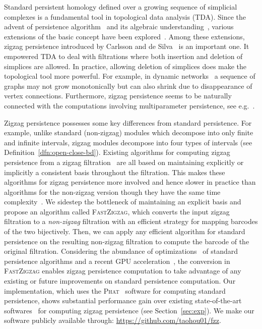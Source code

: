 \documentclass[letterpaper,11pt]{article}
\theoremstyle{mythmstyle}
\theoremstyle{mydefstyle}
\theoremstyle{plain}
\theoremstyle{definition}
\newcommand{\<}[1]{\langle #1\rangle}
\newcommand{\Phat}{\textsc{Phat}}
\begin{document}
Standard persistent homology defined over a growing sequence 
of simplicial complexes is
a fundamental tool in topological data analysis (TDA). Since the advent of
persistence algorithm~\cite{edelsbrunner2000topological} and its algebraic
understanding~\cite{zomorodian2005computing}, various extensions of the basic concept
have been explored~\cite{carlsson2010zigzag,carlsson2009zigzag-realvalue,cohen2009extending,de2011dualities}.
Among these extensions,
zigzag persistence introduced by Carlsson and de Silva~\cite{carlsson2010zigzag} is
an important one. It
empowered TDA to deal with 
filtrations where both insertion
and deletion of simplices are allowed. 
In practice, allowing deletion of simplices does make the topological tool more powerful.
For example, in dynamic networks~\cite{dey2021graph,holme2012temporal}
 a sequence of graphs may not grow monotonically but can also shrink due to
disappearance of vertex connections. Furthermore,
zigzag persistence seems to be naturally connected with the 
computations involving multiparameter
persistence, see e.g.~\cite{dey2021updating,dey2021computing}.

Zigzag persistence possesses some key differences
from standard persistence. For example,
unlike standard (non-zigzag) modules which decompose
into only finite and infinite intervals, zigzag modules
decompose into {four types} of intervals (see Definition~\ref{dfn:open-close-bd}).
Existing algorithms for computing zigzag persistence from a zigzag filtration~\cite{carlsson2009zigzag-realvalue,maria2014zigzag,maria2016computing,maria2019discrete}
are all based on maintaining explicitly or implicitly a consistent basis throughout the filtration.
This makes these algorithms
for zigzag persistence 
more involved and hence slower in practice
than algorithms for
the non-zigzag version though they have the same time complexity~\cite{milosavljevic2011zigzag}.
We sidestep the bottleneck of maintaining an explicit basis 
and propose an algorithm called \textsc{FastZigzag}, which converts
the input zigzag filtration
to a \emph{non-zigzag} filtration with an efficient strategy for mapping barcodes of the two bijectively. Then, we can apply any  efficient algorithm for standard persistence  on the
resulting non-zigzag filtration to compute the barcode of the original filtration.
Considering the abundance of optimizations~\cite{bauer2021ripser,bauer2014clear,bauer2017phat,BDM15,chen2011persistent,CK13} of standard persistence algorithms
and a recent GPU acceleration~\cite{zhang2020gpu},
the conversion in \textsc{FastZigzag} enables zigzag persistence computation
to take advantage of any existing or future improvements on standard persistence computation.
Our implementation, which uses the
\Phat{}~\cite{bauer2017phat} software for computing standard persistence,
shows substantial performance gain
over existing state-of-the-art softwares~\cite{Dionysus2,gudhi:urm}
for computing zigzag persistence
(see Section~\ref{sec:exp}).
We make our software publicly available through: 
\url{https://github.com/taohou01/fzz}.
\end{document}
